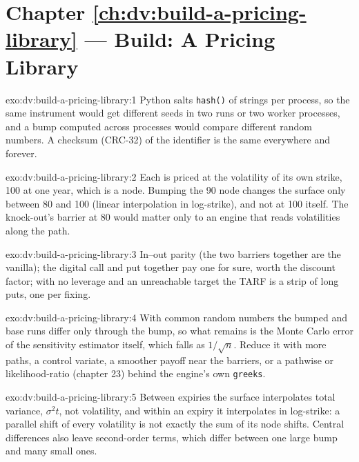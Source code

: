 \section*{Chapter \ref{ch:dv:build-a-pricing-library} --- Build: A Pricing Library}

\begin{solution}{exo:dv:build-a-pricing-library:1}
Python salts \texttt{hash()} of strings per process, so the same instrument would get different seeds in two runs or two worker processes, and a bump
computed across processes would compare different random numbers. A checksum (CRC-32) of the identifier is the same everywhere and forever.
\end{solution}

\begin{solution}{exo:dv:build-a-pricing-library:2}
Each is priced at the volatility of its own strike, 100 at one year, which is a node. Bumping the 90 node changes the surface only between 80 and 100 (linear
interpolation in log-strike), and not at 100 itself. The knock-out's barrier at 80 would matter only to an engine that reads volatilities along the path.
\end{solution}

\begin{solution}{exo:dv:build-a-pricing-library:3}
In--out parity (the two barriers together are the vanilla); the digital call and put together pay one for sure, worth the discount factor; with no leverage and an
unreachable target the TARF is a strip of long puts, one per fixing.
\end{solution}

\begin{solution}{exo:dv:build-a-pricing-library:4}
With common random numbers the bumped and base runs differ only through the bump, so what remains is the Monte Carlo error of the sensitivity estimator itself,
which falls as $1/\sqrt n$. Reduce it with more paths, a control variate, a smoother payoff near the barriers, or a pathwise or likelihood-ratio  (chapter 23)
behind the engine's own \texttt{greeks}.
\end{solution}

\begin{solution}{exo:dv:build-a-pricing-library:5}
Between expiries the surface interpolates total variance, $\sigma^2t$, not volatility, and within an expiry it interpolates in log-strike: a parallel shift of
every volatility is not exactly the sum of its node shifts. Central differences also leave second-order terms, which differ between one large bump and many
small ones.
\end{solution}

